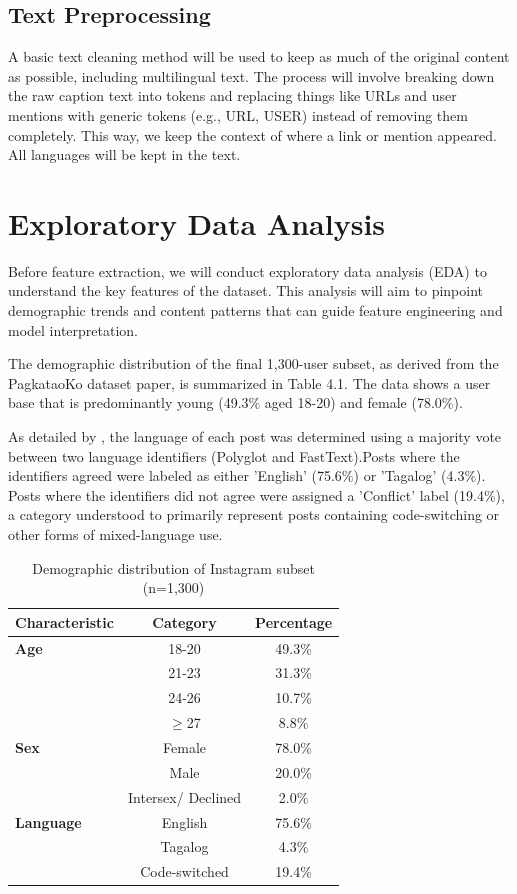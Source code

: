 \subsection{Text Preprocessing}
A basic text cleaning method will be used to keep as much of the original content as possible, including multilingual text. The process will involve breaking down the raw caption text into tokens and replacing things like URLs and user mentions with generic tokens (e.g., URL, USER) instead of removing them completely. This way, we keep the context of where a link or mention appeared. All languages will be kept in the text.


\section{Exploratory Data Analysis}
\label{subsec:eda}

Before feature extraction, we will conduct exploratory data analysis (EDA) to understand the key features of the dataset. This analysis will aim to pinpoint demographic trends and content patterns that can guide feature engineering and model interpretation.

The demographic distribution of the final 1,300-user subset, as derived from the PagkataoKo dataset paper, is summarized in Table 4.1. The data shows a user base that is predominantly young (49.3\% aged 18-20) and female (78.0\%).

As detailed by \citet{tighe_acorda_2022}, the language of each post was determined using a majority vote between two language identifiers (Polyglot and FastText).Posts where the identifiers agreed were labeled as either 'English' (75.6\%) or 'Tagalog' (4.3\%). Posts where the identifiers did not agree were assigned a 'Conflict' label (19.4\%), a category understood to primarily represent posts containing code-switching or other forms of mixed-language use.

\begin{table}[h]
	\centering
	\caption{Demographic distribution of Instagram subset (n=1,300)}
	\label{tab:demo}
	\begin{tabular}{lcc}
		\hline
		\textbf{Characteristic} & \textbf{Category} & \textbf{Percentage} \\ \hline
		\textbf{Age} & 18-20 & 49.3\% \\
		& 21-23 & 31.3\% \\
		& 24-26 & 10.7\% \\
		& $\geq$27 & 8.8\% \\ \hline
		\textbf{Sex} & Female & 78.0\% \\
		& Male & 20.0\% \\
		& Intersex/ Declined & 2.0\% \\ \hline
		\textbf{Language} & English & 75.6\% \\
		& Tagalog & 4.3\% \\
		& Code-switched & 19.4\% \\ \hline
	\end{tabular}
\end{table}
